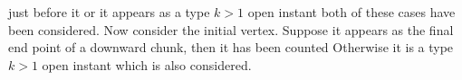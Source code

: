 \documentclass[12pt]{article}
\numberwithin{equation}{section}
\numberwithin{equation}{section}
\theoremstyle{definition}
\renewcommand{\1}{\bf 1}
\begin{document}
just before it or it appears as a type $k>1$ open instant both of these cases have been considered. Now consider the initial vertex. Suppose it appears as the final end point of a downward chunk, then it has been counted Otherwise it is a type $k>1$ open instant which is also considered. 
%
%
%
%
\end{document}
